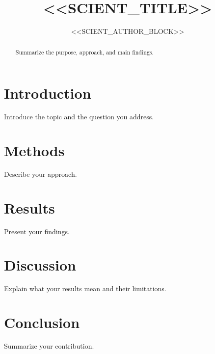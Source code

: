 \documentclass[11pt,a4paper]{article}
\title{<<SCIENT_TITLE>>}
\author{<<SCIENT_AUTHOR_BLOCK>>}
\date{}
\begin{document}
\maketitle

\begin{abstract}
Summarize the purpose, approach, and main findings.
\end{abstract}

\section{Introduction}

Introduce the topic and the question you address.

\section{Methods}

Describe your approach.

\section{Results}

Present your findings.

\section{Discussion}

Explain what your results mean and their limitations.

\section{Conclusion}

Summarize your contribution.
\end{document}
